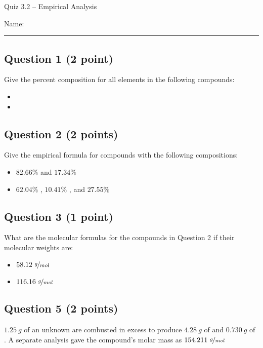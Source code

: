\documentclass[11pt, letterpaper]{memoir}
\begin{document}
	\begin{center}
		{\large	Quiz 3.2 --  Empirical Analysis}
	\end{center}
{\large Name: \rule[-1mm]{4in}{.1pt}
	
	\subsection*{Question 1 (2 point)}
	Give the percent composition for all elements in the following compounds:
	\begin{itemize}
		\item \vspace{0.5em} 
		\item \vspace{2em} 
	\end{itemize}
	
	\vspace{1.5em}
	\subsection*{Question 2 (2 points)}
	Give the empirical formula for compounds with the following compositions:
	
	\begin{itemize}
		\item \vspace{0.5em} $82.66\%$  and $17.34\%$ 
		\item \vspace{6em} $62.04\%$ , $10.41\%$ , and $27.55\%$ 
	\end{itemize}
	
	
	\vspace{6em}
	\subsection*{Question 3 (1 point)}
	What are the molecular formulas for the compounds in Question 2 if their molecular weights are:
	\begin{itemize}
		\item \vspace{0.5em} $58.12~\nicefrac{g}{mol}$
		\item \vspace{1.5em} $116.16~\nicefrac{g}{mol}$
	\end{itemize}
	 

	\subsection*{Question 5 (2 points)}
	$1.25~g$ of an unknown are combusted in excess  to produce $4.28~g$ of  and $0.730~g$ of . A separate analysis gave the compound's molar mass as $154.211~\nicefrac{g}{mol}$
	
}
\end{document}
